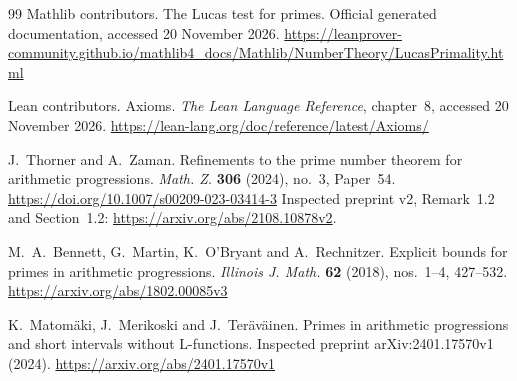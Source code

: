 \documentclass[11pt,reqno]{amsart}
\theoremstyle{blueplain}
\numberwithin{equation}{section}
\begin{document}
\begin{thebibliography}{99}
	Mathlib contributors.
	The Lucas test for primes.
	Official generated documentation, accessed 20 November 2026.
	\url{https://leanprover-community.github.io/mathlib4_docs/Mathlib/NumberTheory/LucasPrimality.html}
	
	Lean contributors.
	Axioms.
	\emph{The Lean Language Reference}, chapter~8,
	accessed 20 November 2026.
	\url{https://lean-lang.org/doc/reference/latest/Axioms/}
	
	J.~Thorner and A.~Zaman.
	Refinements to the prime number theorem for arithmetic progressions.
	\emph{Math. Z.} \textbf{306} (2024), no.~3, Paper~54.
	\url{https://doi.org/10.1007/s00209-023-03414-3}
	Inspected preprint v2, Remark~1.2 and Section~1.2:
	\url{https://arxiv.org/abs/2108.10878v2}.
	
	M.~A.~Bennett, G.~Martin, K.~O'Bryant and A.~Rechnitzer.
	Explicit bounds for primes in arithmetic progressions.
	\emph{Illinois J. Math.} \textbf{62} (2018),
	nos.~1--4, 427--532.
	\url{https://arxiv.org/abs/1802.00085v3}
	
	K.~Matom\"aki, J.~Merikoski and J.~Ter\"av\"ainen.
	Primes in arithmetic progressions and short intervals without L-functions.
	Inspected preprint arXiv:2401.17570v1 (2024).
	\url{https://arxiv.org/abs/2401.17570v1}
	
\end{thebibliography}
\end{document}
